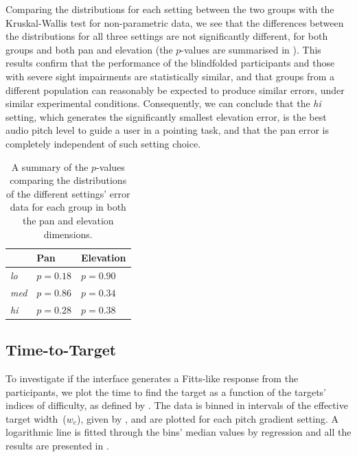 \documentclass[]{interact}
\begin{document}
Comparing the distributions for each setting between the two groups with the Kruskal-Wallis test for non-parametric data, we see that the differences between the distributions for all three settings are not significantly different, for both groups and both pan and elevation (the $p$-values are summarised in ).
This results confirm that the performance of the blindfolded participants and those with severe sight impairments are statistically similar, and that groups from a different population can reasonably be expected to produce similar errors, under similar experimental conditions. 
Consequently, we can conclude that the \textit{hi} setting, which generates the significantly smallest elevation error, is the best audio pitch level to guide a user in a pointing task, and that the pan error is completely independent of such setting choice. 

\begin{table}
  \centering
  \caption{A summary of the $p$-values comparing the distributions of the different settings' error data for each group in both the pan and elevation dimensions. }\label{tab:inter-group-results}
  \begin{tabular}{lll}
    \toprule
                   & Pan      & Elevation \\ \midrule
      \textit{lo}  & $p=0.18$ & $p=0.90$  \\
      \textit{med} & $p=0.86$ & $p=0.34$  \\
      \textit{hi}  & $p=0.28$ & $p=0.38$  \\
    \bottomrule
  \end{tabular}
\end{table}

\subsection{Time-to-Target}

To investigate if the interface generates a Fitts-like response from the participants, we plot the time to find the target as a function of the targets' indices of difficulty, as defined by .
The data is binned in intervals of the effective target width~($w_e$), given by , and are plotted for each pitch gradient setting. 
A logarithmic line is fitted through the bins' median values by regression and all the results are presented in .
\end{document}
